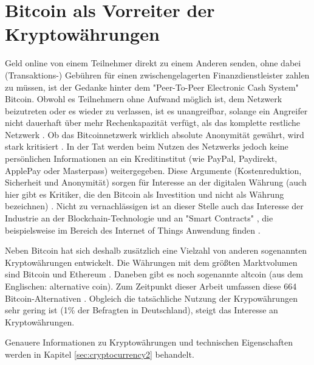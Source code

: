 \section{Bitcoin als Vorreiter der Kryptowährungen}\label{sec:cryptocurrency}
Geld online von einem Teilnehmer direkt zu einem Anderen senden, ohne dabei (Transaktions-) Gebühren für einen zwischengelagerten Finanzdienstleister zahlen zu müssen, ist der Gedanke hinter dem "Peer-To-Peer Electronic Cash System"\citep{nakamoto_bitcoin:_2008} Bitcoin. Obwohl es Teilnehmern ohne Aufwand möglich ist, dem Netzwerk beizutreten oder es wieder zu verlassen, ist es unangreifbar, solange ein Angreifer nicht dauerhaft über mehr Rechenkapazität verfügt, als das komplette restliche Netzwerk \citep{nakamoto_bitcoin:_2008}. Ob das Bitcoinnetzwerk wirklich absolute Anonymität gewährt, wird stark kritisiert \citep{reid_analysis_2013,androulaki_evaluating_2013}. In der Tat werden beim Nutzen des Netzwerks jedoch keine persönlichen Informationen an ein Kreditinstitut (wie PayPal, Paydirekt, ApplePay oder Masterpass) weitergegeben. Diese Argumente (Kostenreduktion, Sicherheit und Anonymität) sorgen für Interesse an der digitalen Währung (auch hier gibt es Kritiker, die den Bitcoin als Investition und nicht als Währung bezeichnen) \citep{baur_bitcoin:_2015}. Nicht zu vernachlässigen ist an dieser Stelle auch das Interesse der Industrie an der Blockchain-Technologie und an "Smart Contracts" \citep[S.~10]{dannen_introducing_2017}, die beispielsweise im Bereich des Internet of Things Anwendung finden \citep{christidis_blockchains_2016}.\par
Neben Bitcoin hat sich deshalb zusätzlich eine Vielzahl von anderen sogenannten Kryptowährungen entwickelt. Die Währungen mit dem größten Marktvolumen sind  Bitcoin und Ethereum \citep{wood_ethereum:_2014} \citep{brandt_infografik:_2017, coinmarketcap_ranking_2017}. Daneben gibt es noch sogenannte \gls{altcoin} (aus dem Englischen: alternative coin\citep{prableen_bajpai_altcoin_2014}). Zum Zeitpunkt dieser Arbeit umfassen diese 664 Bitcoin-Alternativen \citep{coindesk_anzahl_2017}. Obgleich die tatsächliche Nutzung der Krypowährungen sehr gering ist (1\% der Befragten in Deutschland\citep{tsys_kennen_2016}), steigt das Interesse an Kryptowährungen\citep{wikitrends_compare_2017,googletrends_googletrends_2017}.\par
Genauere Informationen zu Kryptowährungen und technischen Eigenschaften werden in Kapitel \ref{sec:cryptocurrency2} behandelt.

